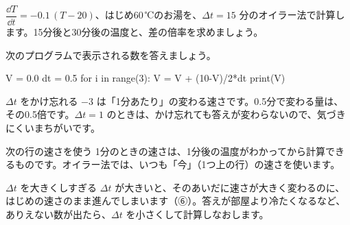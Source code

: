 \begingroup{}%
\noindent\begin{minipage}[t]{0.49\linewidth}
\begin{jibun}
\raggedright $\dfrac{\dd T}{\dd t}=-0.1\,(T-20)$、はじめ60\,℃のお湯を、$\Delta t=15$ 分のオイラー法で計算します。15分後と30分後の温度と、差の倍率を求めましょう。
\end{jibun}
\end{minipage}\hfill
\begin{minipage}[t]{0.49\linewidth}
\begin{jibun}
\raggedright 次のプログラムで表示される数を答えましょう。\par\vspace{2pt}
\begin{bkcode}
V = 0.0
dt = 0.5
for i in range(3):
    V = V + (10-V)/2*dt
print(V)
\end{bkcode}
\end{jibun}
\end{minipage}\par
\endgroup


\begin{tsumazuki}{$\Delta t$ をかけ忘れる}
$-3$ は「1分あたり」の変わる速さです。0.5分で変わる量は、その0.5倍です。$\Delta t=1$ のときは、かけ忘れても答えが変わらないので、気づきにくいまちがいです。
\end{tsumazuki}

\begin{tsumazuki}{次の行の速さを使う}
1分のときの速さは、1分後の温度がわかってから計算できるものです。オイラー法では、いつも「今」（1つ上の行）の速さを使います。
\end{tsumazuki}

\begin{tsumazuki}{$\Delta t$ を大きくしすぎる}
$\Delta t$ が大きいと、そのあいだに速さが大きく変わるのに、はじめの速さのまま進んでしまいます（⑥）。答えが部屋より冷たくなるなど、ありえない数が出たら、$\Delta t$ を小さくして計算しなおします。
\end{tsumazuki}

